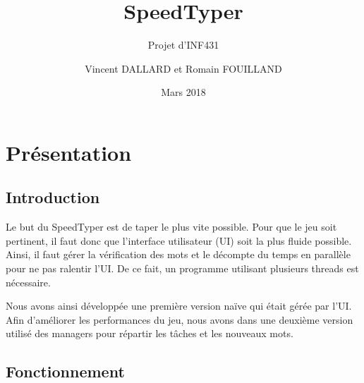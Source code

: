 \documentclass[a4paper,11pt]{article}
\title{SpeedTyper}
\author{Vincent DALLARD et Romain FOUILLAND}
\subtitle{Projet d'INF431}
\date{Mars 2018}
\begin{document}
\maketitle
\section{Présentation}
\subsection{Introduction}
Le but du SpeedTyper est de taper le plus vite possible. Pour que le jeu soit pertinent, il faut donc que l'interface utilisateur (UI) soit la plus fluide possible. Ainsi, il faut gérer la vérification des mots et le décompte du temps en parallèle pour ne pas ralentir l'UI. De ce fait, un programme utilisant plusieurs threads est nécessaire.\par
Nous avons ainsi développée une première version naïve qui était gérée par l'UI. Afin d'améliorer les performances du jeu, nous avons dans une deuxième version utilisé des managers pour répartir les tâches et les nouveaux mots.\par

\subsection{Fonctionnement}
\end{document}
